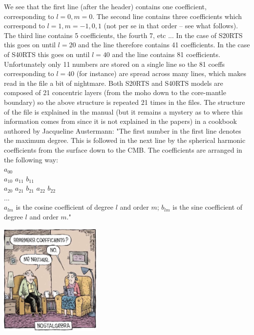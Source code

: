 We see that the first line (after the header) contains one coefficient, corresponding to ${l=0},{m=0}$. 
The second line contains three coefficients which correspond to ${l=1},{m=-1,0,1}$ (not 
per se in that order -- see what follows). The third line contains 5 
coefficients, the fourth 7, etc ... 
In the case of S20RTS this goes on until $l=20$ and the line therefore contains 41 coefficients.
In the case of S40RTS this goes on until $l=40$ and the line contains 81 coefficients.
Unfortunately only 11 numbers are stored on a single line so the 81 coeffs corresponding 
to $l=40$ (for instance)
are spread across many lines, which makes read in the file a bit of nightmare. 
Both S20RTS and S40RTS models are composed of 21 concentric layers (from the moho down 
to the core-mantle boundary) 
so the above structure is repeated 21 times in the files. 
The structure of the file is explained in the \aspect manual (but it remains a mystery 
as to where this information comes from since it is not explained in the papers) 
in a cookbook authored by Jacqueline Austermann:  
{\color{brown}
"The first number in the first line denotes the maximum degree. This is followed in
the next line by the spherical harmonic coefficients from the surface down to the
CMB. The coefficients are arranged in the following way:\\
$a_{00}$ \\
$a_{10}$ $a_{11}$ $b_{11}$ \\
$a_{20}$ $a_{21}$ $b_{21}$ $a_{22}$ $b_{22}$ \\
... \\
$a_{lm}$ is the cosine coefficient of degree $l$ and order $m$; $b_{lm}$ is
the sine coefficient of degree $l$ and order $m$."}

\begin{center}
\includegraphics[width=5cm]{python_codes/fieldstone_85/images/fun}
\end{center}


